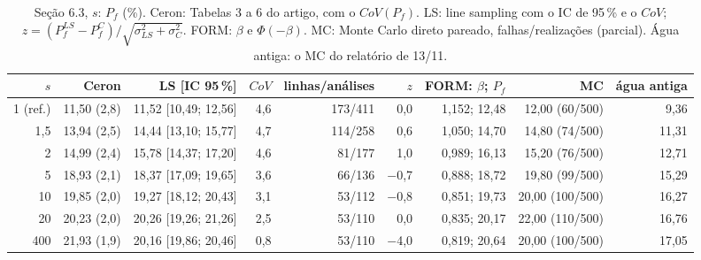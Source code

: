 \begin{table}[htbp]\centering\scriptsize\setlength{\tabcolsep}{3pt}
\caption{Seção 6.3, $s$: $P_f$ (\%). Ceron: Tabelas 3 a 6 do artigo, com o $CoV(P_f)$. LS: line sampling com o IC de 95\,\% e o $CoV$; $z = (P_f^{LS} - P_f^{C})/\sqrt{\sigma_{LS}^2 + \sigma_C^2}$. FORM: $\beta$ e $\Phi(-\beta)$. MC: Monte Carlo direto pareado, falhas/realizações (parcial). Água antiga: o MC do relatório de 13/11.}\label{tab:pf_s}
\begin{tabular}{rrrrrrrrr}\toprule
$s$ & Ceron & LS [IC 95\,\%] & $CoV$ & linhas/análises & $z$ & FORM: $\beta$; $P_f$ & MC & água antiga \\\midrule
1 (ref.) & 11{,}50 (2{,}8) & 11{,}52 [10{,}49; 12{,}56] & 4{,}6 & 173/411 & 0{,}0 & 1{,}152; 12{,}48 & 12{,}00 (60/500) & 9{,}36 \\
1{,}5 & 13{,}94 (2{,}5) & 14{,}44 [13{,}10; 15{,}77] & 4{,}7 & 114/258 & 0{,}6 & 1{,}050; 14{,}70 & 14{,}80 (74/500) & 11{,}31 \\
2 & 14{,}99 (2{,}4) & 15{,}78 [14{,}37; 17{,}20] & 4{,}6 & 81/177 & 1{,}0 & 0{,}989; 16{,}13 & 15{,}20 (76/500) & 12{,}71 \\
5 & 18{,}93 (2{,}1) & 18{,}37 [17{,}09; 19{,}65] & 3{,}6 & 66/136 & $-$0{,}7 & 0{,}888; 18{,}72 & 19{,}80 (99/500) & 15{,}29 \\
10 & 19{,}85 (2{,}0) & 19{,}27 [18{,}12; 20{,}43] & 3{,}1 & 53/112 & $-$0{,}8 & 0{,}851; 19{,}73 & 20{,}00 (100/500) & 16{,}27 \\
20 & 20{,}23 (2{,}0) & 20{,}26 [19{,}26; 21{,}26] & 2{,}5 & 53/110 & 0{,}0 & 0{,}835; 20{,}17 & 22{,}00 (110/500) & 16{,}76 \\
400 & 21{,}93 (1{,}9) & 20{,}16 [19{,}86; 20{,}46] & 0{,}8 & 53/110 & $-$4{,}0 & 0{,}819; 20{,}64 & 20{,}00 (100/500) & 17{,}05 \\
\bottomrule\end{tabular}\end{table}
